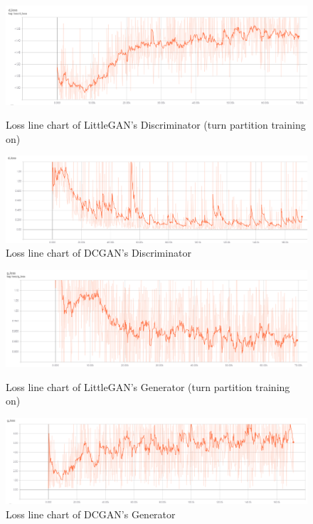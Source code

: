 \begin{figure}
    \begin{minipage}[t]{0.49\linewidth}
        \centering
        \includegraphics[width=\textwidth]{figures/loss_part_on_d.png}
        \caption{Loss line chart of LittleGAN's Discriminator (turn partition training on)}
        \label{loss_part_on_d}
    \end{minipage}
        \hfill
    \begin{minipage}[t]{0.49\linewidth}
        \centering
        \includegraphics[width=\textwidth]{figures/loss_dcgan_d.png}
        \caption{Loss line chart of DCGAN's Discriminator}
        \label{loss_dcgan_d}
    \end{minipage}
\end{figure}

\begin{figure}
    \begin{minipage}[t]{0.49\linewidth}
        \centering
        \includegraphics[width=\textwidth]{figures/loss_part_on_g.png}
        \caption{Loss line chart of LittleGAN's Generator (turn partition training on)}
        \label{loss_part_on_g}
    \end{minipage}
        \hfill
    \begin{minipage}[t]{0.49\linewidth}
        \centering
        \includegraphics[width=\textwidth]{figures/loss_dcgan_g.png}
        \caption{Loss line chart of DCGAN's Generator}
        \label{loss_dcgan_g}
    \end{minipage}
\end{figure}

